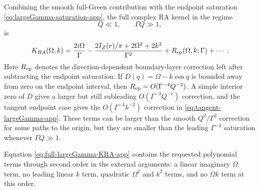 \documentclass[aps,prx,preprint,amsmath,amssymb]{revtex4-2}
\begin{document}
Combining the smooth full-Green contribution with the endpoint saturation
\eqref{eq:largeGamma-saturation-app}, the full complex RA kernel in the regime
\[
Q\ll1,
\qquad
\Gamma Q\gg1,
\]
is
\begin{equation}
\label{eq:full-largeGamma-KRA-app}
K_{RA}(\Omega,k)
=
\frac{2i\Omega}{\Gamma}
-
\frac{
2I_Z(r)/\pi+2\Omega^2+2k^2
}{\Gamma^2}
+R_{\rm ep}(\Omega,k;\Gamma)
+\cdots .
\end{equation}
Here \(R_{\rm ep}\) denotes the direction-dependent boundary-layer correction
left after subtracting the endpoint saturation.  If \(D(q)=\Omega-k\cos q\) is
bounded away from zero on the endpoint interval, then
\(R_{\rm ep}=O(\Gamma^{-4}Q^{-2})\).  A simple interior zero of \(D\) gives a
larger but still subleading \(O(\Gamma^{-3}Q^{-1})\) correction, and the
tangent endpoint case gives the \(O(\Gamma^{-4}k^{-2})\) correction in
\eqref{eq:tangent-largeGamma-app}.  These terms can be larger than the smooth
\(Q^2/\Gamma^2\) correction for some paths to the origin, but they are smaller
than the leading \(\Gamma^{-2}\) saturation whenever \(\Gamma Q\gg1\).

Equation \eqref{eq:full-largeGamma-KRA-app} contains the requested polynomial
terms through second order in the external arguments: a linear imaginary
\(\Omega\) term, no leading linear \(k\) term, quadratic
\(\Omega^2\) and \(k^2\) terms, and no \(\Omega k\) term at this order.
\end{document}
